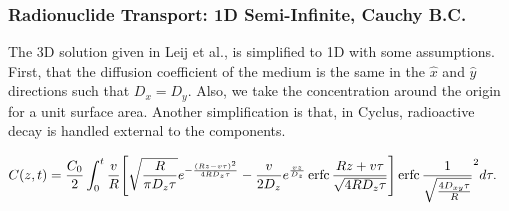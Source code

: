 \begin{frame}
\frametitle{Radionuclide Transport: 1D Semi-Infinite, Cauchy B.C.}
\footnotesize{
The 3D solution given in Leij et al., \cite{leij_analytical_1991} is simplified 
to 1D with some assumptions. First, that the diffusion 
coefficient of the medium is the same in the $\hat{x}$ and $\hat{y}$ directions 
such that $D_x=D_y$. Also, we take the concentration around the origin for a 
unit surface area.
Another simplification is that, in Cyclus, radioactive decay is handled external 
to the components.

\begin{align}
  C(z,t)&= \frac{C_0}{2}\int_0^t\frac{v}{R}
  \Bigg[\sqrt{\frac{R}{\pi D_z\tau}}e^{-\frac{(Rz-v\tau)^2}{4RD_z\tau}} -
    \frac{v}{2D_z}e^\frac{vz}{D_z}\operatorname{erfc}{\frac{Rz+v\tau}{\sqrt{4RD_z\tau}}}\Bigg]
    \operatorname{erfc}{\frac{1}{\sqrt{\frac{4D_{xy}\tau}{R}}} }^2
  d\tau .
  \label{simple_leij}
\end{align}
}
\end{frame}
